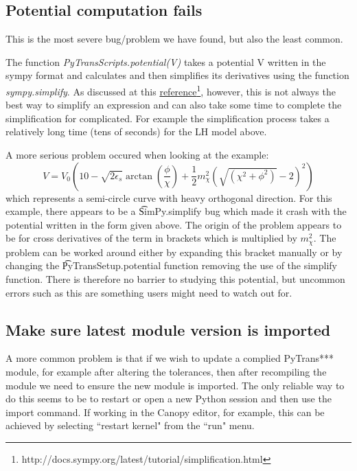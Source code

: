 \documentclass[10pt,
amsmath,amssymb,
aps,prd,nofootinbib,eqsecnum,a4paper]{revtex4}
\def\be{\begin{equation}}
\def\ee{\end{equation}}
\begin{document}
\subsection{Potential computation fails}

This is the most severe bug/problem we have found, but also the least common. 

The function {\it PyTransScripts.potential(V)} takes a potential V written in the sympy format and 
calculates and then simplifies its derivatives using the function {\it sympy.simplify}. As discussed at 
this \href{http://docs.sympy.org/latest/tutorial/simplification.html}{reference}\footnote{http://docs.sympy.org/latest/tutorial/simplification.html}, however, this is not always 
the best way to simplify an expression and can also take some time to complete the simplification 
for complicated. For example the simplification process takes a relatively long time (tens of seconds) for the LH model 
above.

A more serious problem occured when looking at the example:
\be
V = V_0 \left (10 - \sqrt {2 \epsilon_s} \arctan \left ( \frac{\phi}{\chi} \right ) +    \frac{1}{2} m_\chi^2 
\left ( \sqrt {\left (\chi^2 + \phi^2 \right )} - 2 \right )^2 \right)
\ee
which represents a semi-circle curve with heavy orthogonal direction.
For this example, there appears to be a 
{\t SimPy.simplify} bug which made it crash with 
the potential written in the form given above. The origin of the problem appears to be for cross derivatives 
of the term 
in brackets which is 
multiplied by $m_\chi^2$. The problem can be worked around either by expanding this bracket manually
or by changing the {\t PyTransSetup.potential} function 
removing the use of the simplify function. There is therefore no barrier to studying this potential, but 
uncommon errors such as this are something users might need to watch out for. 

\subsection{Make sure latest module version is imported}

A more common problem is that if we wish to update a complied PyTrans*** module, for 
example after altering the tolerances, then after recompiling the module we need to 
ensure the new module is imported. The only reliable way to do this seems to be to restart or open 
a new Python session
 and then use the import command. If working in the Canopy editor, for example, this can be achieved by selecting 
 ``restart kernel" from the ``run" menu. 
\end{document}
